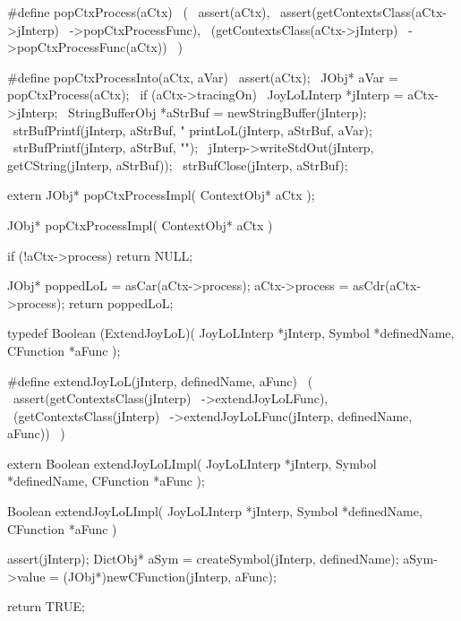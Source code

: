 \startCHeader
#define popCtxProcess(aCtx)                    \
  (                                            \
    assert(aCtx),                              \
    assert(getContextsClass(aCtx->jInterp)     \
      ->popCtxProcessFunc),                    \
    (getContextsClass(aCtx->jInterp)           \
      ->popCtxProcessFunc(aCtx))               \
  )

#define popCtxProcessInto(aCtx, aVar)                           \
assert(aCtx);                                                   \
JObj* aVar = popCtxProcess(aCtx);                           \
if (aCtx->tracingOn) {                                          \
  JoyLoLInterp *jInterp = aCtx->jInterp;                        \
  StringBufferObj *aStrBuf = newStringBuffer(jInterp);          \
  strBufPrintf(jInterp, aStrBuf, "%
  printLoL(jInterp, aStrBuf, aVar);                             \
  strBufPrintf(jInterp, aStrBuf, "\n");                         \
  jInterp->writeStdOut(jInterp, getCString(jInterp, aStrBuf));  \
  strBufClose(jInterp, aStrBuf);                                \
}
\stopCHeader

\setCHeaderStream{private}
\startCHeader
extern JObj* popCtxProcessImpl(
  ContextObj* aCtx
);
\stopCHeader
\setCHeaderStream{public}

\startCCode
JObj* popCtxProcessImpl(
  ContextObj* aCtx
) {
  if (!aCtx->process) return NULL;

  JObj* poppedLoL = asCar(aCtx->process);
  aCtx->process       = asCdr(aCtx->process);
  return poppedLoL;
}
\stopCCode

\startCHeader
typedef Boolean (ExtendJoyLoL)(
  JoyLoLInterp *jInterp,
  Symbol       *definedName,
  CFunction    *aFunc
);

#define extendJoyLoL(jInterp, definedName, aFunc)       \
  (                                                     \
    assert(getContextsClass(jInterp)                    \
      ->extendJoyLoLFunc),                              \
    (getContextsClass(jInterp)                          \
      ->extendJoyLoLFunc(jInterp, definedName, aFunc))  \
  )
\stopCHeader

\startCHeader
extern Boolean extendJoyLoLImpl(
  JoyLoLInterp *jInterp,
  Symbol       *definedName,
  CFunction    *aFunc
);
\stopCHeader
\setCHeaderStream{public}

\startCCode
Boolean extendJoyLoLImpl(
  JoyLoLInterp *jInterp,
  Symbol       *definedName,
  CFunction    *aFunc
) {
  assert(jInterp);
  DictObj* aSym =
    createSymbol(jInterp, definedName);
  aSym->value =
    (JObj*)newCFunction(jInterp, aFunc);

  return TRUE;
}
\stopCCode

